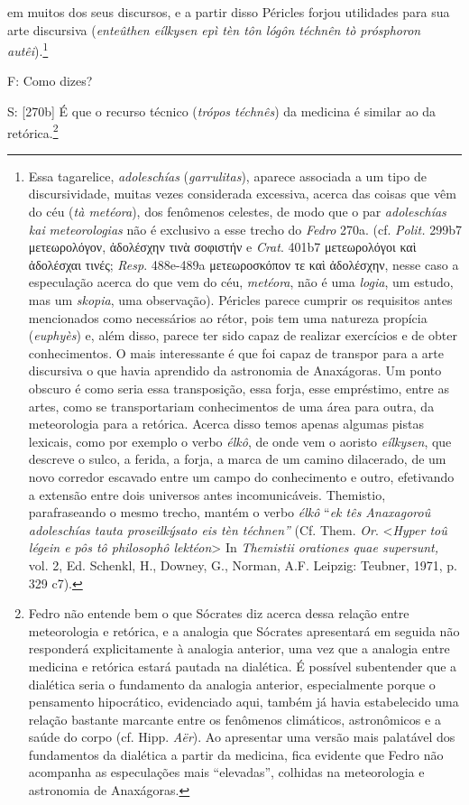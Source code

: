 em muitos dos seus discursos, e a partir disso Péricles forjou
utilidades para sua arte discursiva (\emph{enteûthen eílkysen epì tèn
tôn lógôn téchnên tò prósphoron autêi}).\footnote{Essa tagarelice,
  \emph{adoleschías} (\emph{garrulitas}), aparece associada a um tipo de
  discursividade, muitas vezes considerada excessiva, acerca das coisas
  que vêm do céu (\emph{tà metéora}), dos fenômenos celestes, de modo
  que o par \emph{adoleschías} \emph{kai} \emph{meteorologias} não é
  exclusivo a esse trecho do \emph{Fedro} 270a. (cf. \emph{Polit.} 299b7
  μετεωρολόγον, ἀδολέσχην τινὰ σοφιστήν e \emph{Crat}. 401b7
  μετεωρολόγοι καὶ ἀδολέσχαι τινές; \emph{Resp}. 488e-489a μετεωροσκόπον
  τε καὶ ἀδολέσχην, nesse caso a especulação acerca do que vem do céu,
  \emph{metéora}, não é uma \emph{logia}, um estudo, mas um
  \emph{skopia}, uma observação). Péricles parece cumprir os requisitos
  antes mencionados como necessários ao rétor, pois tem uma natureza
  propícia (\emph{euphyès}) e, além disso, parece ter sido capaz de
  realizar exercícios e de obter conhecimentos. O mais interessante é
  que foi capaz de transpor para a arte discursiva o que havia aprendido
  da astronomia de Anaxágoras. Um ponto obscuro é como seria essa
  transposição, essa forja, esse empréstimo, entre as artes, como se
  transportariam conhecimentos de uma área para outra, da meteorologia
  para a retórica. Acerca disso temos apenas algumas pistas lexicais,
  como por exemplo o verbo \emph{élkô}, de onde vem o aoristo
  \emph{eílkysen}, que descreve o sulco, a ferida, a forja, a marca de
  um camino dilacerado, de um novo corredor escavado entre um campo do
  conhecimento e outro, efetivando a extensão entre dois universos antes
  incomunicáveis. Themistio, parafraseando o mesmo trecho, mantém o
  verbo \emph{élkô} ``\emph{ek tês Anaxagoroû adoleschías tauta
  proseilkýsato eis tèn téchnen''} (Cf. Them. \emph{Or}.
  \textless{}\emph{Hyper toû légein e pôs tô philosophô
  lektéon}\textgreater{} In \emph{Themistii orationes quae supersunt,}
  vol. 2, Ed. Schenkl, H., Downey, G., Norman, A.F. Leipzig: Teubner,
  1971, p. 329 c7).}

F: Como dizes?

S: {[}270b{]} É que o recurso técnico (\emph{trópos téchnês}) da
medicina é similar ao da retórica.\footnote{Fedro não entende bem o que
  Sócrates diz acerca dessa relação entre meteorologia e retórica, e a
  analogia que Sócrates apresentará em seguida não responderá
  explicitamente à analogia anterior, uma vez que a analogia entre
  medicina e retórica estará pautada na dialética. É possível
  subentender que a dialética seria o fundamento da analogia anterior,
  especialmente porque o pensamento hipocrático, evidenciado aqui,
  também já havia estabelecido uma relação bastante marcante entre os
  fenômenos climáticos, astronômicos e a saúde do corpo (cf. Hipp.
  \emph{Aër}). Ao apresentar uma versão mais palatável dos fundamentos
  da dialética a partir da medicina, fica evidente que Fedro não
  acompanha as especulações mais ``elevadas'', colhidas na meteorologia
  e astronomia de Anaxágoras.}

